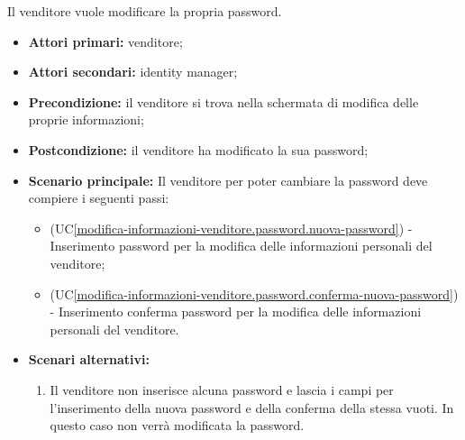 Il venditore vuole modificare la propria password.
\begin{itemize}
    \item \textbf{Attori primari:} venditore;
	\item \textbf{Attori secondari:} identity manager;
    \item \textbf{Precondizione:} il venditore si trova nella schermata di modifica delle proprie informazioni;
    \item \textbf{Postcondizione:} il venditore ha modificato la sua password;
    \item \textbf{Scenario principale:} Il venditore per poter cambiare la password deve compiere i seguenti passi:
        \begin{itemize}
            \item (UC\ref{modifica-informazioni-venditore.password.nuova-password}) - Inserimento password per la modifica delle informazioni personali del venditore;
            \item (UC\ref{modifica-informazioni-venditore.password.conferma-nuova-password}) - Inserimento conferma password per la modifica delle informazioni personali del venditore.
        \end{itemize}
    \item \textbf{Scenari alternativi:}
    \begin{enumerate}[label=\lett]
    	\item Il venditore non inserisce alcuna password e lascia i campi per l'inserimento della nuova password e della conferma della stessa vuoti. In questo caso non verrà modificata la password.
    \end{enumerate}
\end{itemize}

\label{modifica-informazioni-venditore.password.nuova-password}

